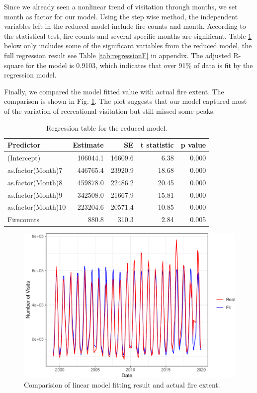 \documentclass[
  12pt,
]{article}
\begin{document}
Since we already seen a nonlinear trend of visitation through months, we set month as factor for our model. Using the step wise method, the independent variables left in the reduced model include fire counts and month. According to the statistical test, fire counts and several specific months are significant.
Table \ref{tab:regression} below only includes some of the significant variables from the reduced model, the full regression result see Table \ref{tab:regressionF} in appendix. The adjusted R-square for the model is 0.9103, which indicates that over 91\% of data is fit by the regression model.

Finally, we compared the model fitted value with actual fire extent. The comparison is shown in Fig. \ref{fig:fitplot}. The plot suggests that our model captured most of the variation of recreational visitation but still missed some peaks.

\newpage
\begin{table}

\caption{\label{tab:regression}Regression table for the reduced model. }
\centering
\begin{tabular}[t]{l|r|r|r|r}
\hline
Predictor & Estimate & SE & t statistic & p value\\
\hline
(Intercept) & 106044.1 & 16609.6 & 6.38 & 0.000\\
\hline
as.factor(Month)7 & 446765.4 & 23920.9 & 18.68 & 0.000\\
\hline
as.factor(Month)8 & 459878.0 & 22486.2 & 20.45 & 0.000\\
\hline
as.factor(Month)9 & 342508.0 & 21667.9 & 15.81 & 0.000\\
\hline
as.factor(Month)10 & 223204.6 & 20571.4 & 10.85 & 0.000\\
\hline
Firecounts & 880.8 & 310.3 & 2.84 & 0.005\\
\hline
\end{tabular}
\end{table}

\begin{figure}
\centering
\includegraphics{CodeFinal_files/figure-latex/fitplot-1.pdf}
\caption{\label{fig:fitplot}Comparision of linear model fitting result and actual fire extent.}
\end{figure}
\end{document}
